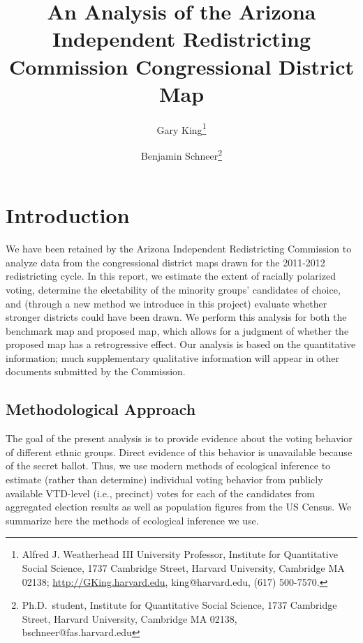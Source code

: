 \documentclass[12pt]{scrartcl}
\title{An Analysis of the Arizona Independent Redistricting Commission
  Congressional District Map}
\author{Gary King\thanks{Alfred J.
    Weatherhead III University Professor, Institute for Quantitative
    Social Science, 1737 Cambridge Street, Harvard University,
    Cambridge MA 02138; \url{http://GKing.harvard.edu},
    king@harvard.edu, (617) 500-7570.}  \and Benjamin
  Schneer\thanks{Ph.D.\ student, Institute for Quantitative Social
    Science, 1737 Cambridge Street, Harvard University, Cambridge MA
    02138, bschneer@fas.harvard.edu} }
\begin{document}
\maketitle

\doublespacing

\section{Introduction}

We have been retained by the Arizona Independent Redistricting
Commission to analyze data from the congressional district maps drawn
for the 2011-2012 redistricting cycle. In this report, we estimate the
extent of racially polarized voting, determine the electability of the
minority groups' candidates of choice, and (through a new method we
introduce in this project) evaluate whether stronger districts could
have been drawn.  We perform this analysis for both the benchmark map
and proposed map, which allows for a judgment of whether the proposed
map has a retrogressive effect.  Our analysis is based on the
quantitative information; much supplementary qualitative information
will appear in other documents submitted by the Commission.



\subsection{Methodological Approach}

The goal of the present analysis is to provide evidence about the
voting behavior of different ethnic groups. Direct evidence of this
behavior is unavailable because of the secret ballot. Thus, we use
modern methods of ecological inference to estimate (rather than
determine) individual voting behavior from publicly available
VTD-level (i.e., precinct) votes for each of the candidates from
aggregated election results as well as population figures from the US
Census.  We summarize here the methods of ecological inference we use.
\end{document}
